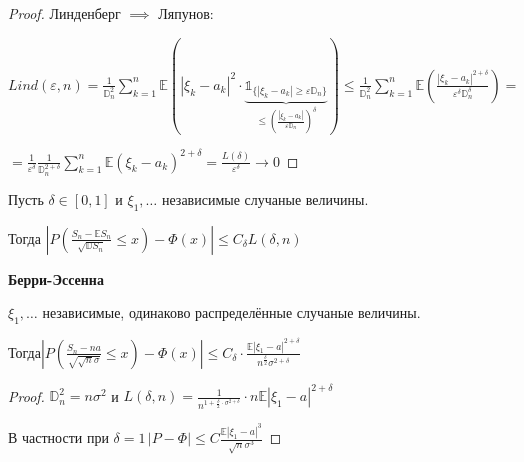 \begin{proof}

    Линденберг $\implies$ Ляпунов:

    $Lind(\varepsilon, n) = \frac{1}{\mathbb{D}^2_n} \sum_{k=1}^{n} \mathbb{E} \left( |\xi_k - a_k|^2 \cdot \underbrace{\mathds{1}_{\{ |\xi_k - a_k| \geq \varepsilon \mathbb{D}_n \}}}_{\leq \left( \frac{|\xi_k - a_k|}{\varepsilon \mathbb{D}_n} \right)^{\delta}} \right) \leq \frac{1}{\mathbb{D}^2_n} \sum_{k=1}^{n} \mathbb{E} \left( \frac{| \xi_k - a_k |^{2 + \delta}}{\varepsilon^{\delta} \mathbb{D}_n^{\delta}} \right) =$

    $= \frac{1}{\varepsilon^{\delta}} \frac{1}{\mathbb{D}_n^{2 + \delta}} \sum_{k=1}^{n} \mathbb{E} \left( \xi_k - a_k \right)^{2 + \delta} = \frac{L(\delta)}{\varepsilon^{\delta}} \to 0$

\end{proof}

\begin{theorem}
    Пусть $\delta \in [0, 1]$ и $\xi_1, \ldots$ независимые случаные величины.

    Тогда $\left | P \left( \frac{S_n - \mathbb{E} S_n}{\sqrt{\mathbb{D} S_n}} \leqslant x \right) - \Phi (x) \right | \leqslant C_{\delta} L (\delta, n)$
\end{theorem}

\begin{theorem}
    \textbf{Берри-Эссенна}

    $\xi_1, \ldots$ независимые, одинаково распределённые случаные величины.

    Тогда$\left | P \left( \frac{S_n - na}{\sqrt{\sqrt{n} \sigma}} \leqslant x \right) - \Phi (x) \right | \leqslant C_{\delta} \cdot \frac{\mathbb{E} |\xi_1 - a|^{2 + \delta}}{n^{\frac{\delta}{2}} \sigma^{2 + \delta}}$
\end{theorem}

\begin{proof}
    $\mathbb{D}_n^2 = n \sigma^2$ и $L (\delta, n) = \frac{1}{n^{1 + \frac{\delta}{2} \cdot \sigma^{2 + \delta}}} \cdot n \mathbb{E} |\xi_1 - a|^{2 + \delta}$

    В частности при $\delta = 1 \, |P - \Phi| \leqslant C \frac{\mathbb{E} |\xi_1 - a|^3}{\sqrt{n} \sigma^3}$
\end{proof}

